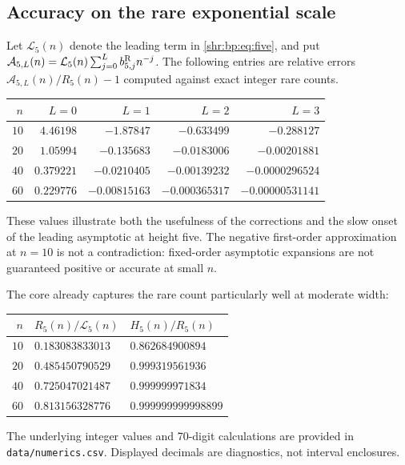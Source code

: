 \documentclass[11pt,letterpaper]{article}
\numberwithin{equation}{section}
\theoremstyle{definition}
\newcommand{\1}{\mathbf 1}
\begin{document}
\subsection{Accuracy on the rare exponential scale}
Let $\mathcal L_5(n)$ denote the leading term in \eqref{shr:bp:eq:five}, and put
$\mathcal A_{5,L}(n)=\mathcal L_5(n)\sum_{j=0}^L b_{5,j}^{\rm R}n^{-j}$.
The following entries are relative errors $\mathcal A_{5,L}(n)/R_5(n)-1$
computed against exact integer rare counts.
\begin{center}\small
\begin{tabular}{@{}rrrrr@{}}
\toprule
$n$ & $L=0$ & $L=1$ & $L=2$ & $L=3$\\
\midrule
$10$ & $4.46198$ & $-1.87847$ & $-0.633499$ & $-0.288127$\\
$20$ & $1.05994$ & $-0.135683$ & $-0.0183006$ & $-0.00201881$\\
$40$ & $0.379221$ & $-0.0210405$ & $-0.00139232$ & $-0.0000296524$\\
$60$ & $0.229776$ & $-0.00815163$ & $-0.000365317$ & $-0.00000531141$\\
\bottomrule
\end{tabular}
\end{center}
These values illustrate both the usefulness of the corrections and the
slow onset of the leading asymptotic at height five. The negative
first-order approximation at $n=10$ is not a contradiction: fixed-order
asymptotic expansions are not guaranteed positive or accurate at small
$n$.

The core already captures the rare count particularly well at moderate
width:
\begin{center}\small
\begin{tabular}{@{}rll@{}}
\toprule
$n$ & $R_5(n)/\mathcal L_5(n)$ & $H_5(n)/R_5(n)$\\
\midrule
$10$ & $0.183083833013$ & $0.862684900894$\\
$20$ & $0.485450790529$ & $0.999319561936$\\
$40$ & $0.725047021487$ & $0.999999971834$\\
$60$ & $0.813156328776$ & $0.999999999998899$\\
\bottomrule
\end{tabular}
\end{center}
The underlying integer values and 70-digit calculations are provided in
\texttt{data/numerics.csv}. Displayed decimals are diagnostics, not
interval enclosures.
\end{document}
